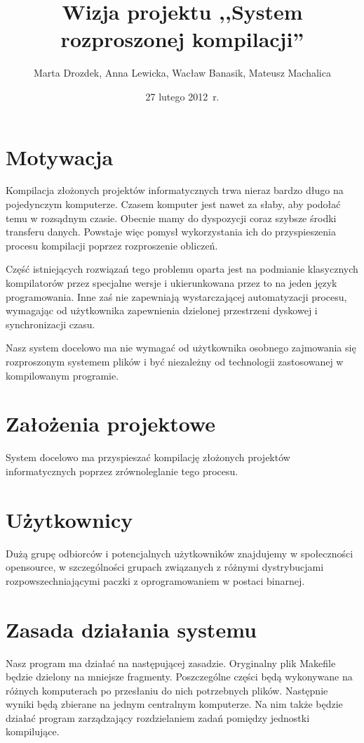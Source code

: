 \documentclass[a4paper]{article}
\title{Wizja projektu ,,System rozproszonej kompilacji''}
\author{Marta Drozdek, Anna Lewicka, Wacław Banasik, Mateusz Machalica}
\date{27 lutego 2012~r.}
\begin{document}
\maketitle

\section{Motywacja}
Kompilacja złożonych projektów informatycznych trwa nieraz bardzo długo na pojedynczym komputerze. Czasem komputer jest nawet za słaby, aby podołać temu w rozsądnym czasie. Obecnie mamy do dyspozycji coraz szybsze środki transferu danych. Powstaje więc pomysł wykorzystania ich do przyspieszenia procesu kompilacji poprzez rozproszenie obliczeń.

Część istniejących rozwiązań tego problemu oparta jest na podmianie klasycznych kompilatorów przez specjalne wersje i ukierunkowana przez to na jeden język programowania. Inne zaś nie zapewniają wystarczającej automatyzacji procesu, wymagając od użytkownika zapewnienia dzielonej przestrzeni dyskowej i synchronizacji czasu.

Nasz system docelowo ma nie wymagać od użytkownika osobnego zajmowania się rozproszonym systemem plików i być niezależny od technologii zastosowanej w kompilowanym programie.

\section{Założenia projektowe}
System docelowo ma przyspieszać kompilację złożonych projektów informatycznych poprzez zrównoleglanie tego procesu.

\section{Użytkownicy}
Dużą grupę odbiorców i potencjalnych użytkowników znajdujemy w społeczności opensource, w szczególności grupach związanych z różnymi dystrybucjami rozpowszechniającymi paczki z oprogramowaniem w postaci binarnej.

\section{Zasada działania systemu}
	Nasz program ma działać na następującej zasadzie. Oryginalny plik Makefile będzie dzielony na mniejsze fragmenty. Poszczególne części będą wykonywane na różnych komputerach po przesłaniu do nich potrzebnych plików. Następnie wyniki będą zbierane na jednym centralnym komputerze. Na nim także będzie działać program zarządzający rozdzielaniem zadań pomiędzy jednostki kompilujące.
\end{document}

